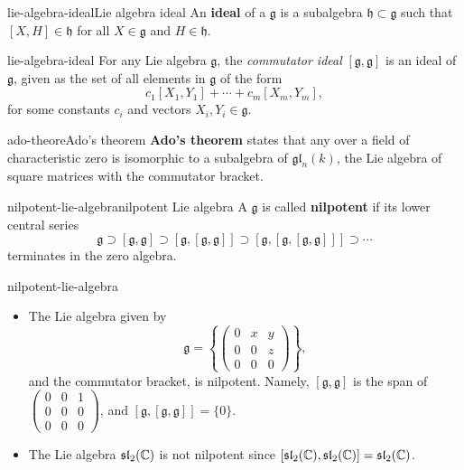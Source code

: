 \begin{topic}{lie-algebra-ideal}{Lie algebra ideal}
    An \textbf{ideal} of a  $\mathfrak{g}$ is a subalgebra $\mathfrak{h} \subset \mathfrak{g}$ such that $[X, H] \in \mathfrak{h}$ for all $X \in \mathfrak{g}$ and $H \in \mathfrak{h}$.
\end{topic}

\begin{example}{lie-algebra-ideal}
    For any Lie algebra $\mathfrak{g}$, the \textit{commutator ideal} $[\mathfrak{g}, \mathfrak{g}]$ is an ideal of $\mathfrak{g}$, given as the set of all elements in $\mathfrak{g}$ of the form
    \[ c_1 [X_1, Y_1] + \cdots + c_m [X_m, Y_m] , \]
    for some constants $c_i$ and vectors $X_i, Y_i \in \mathfrak{g}$.
\end{example}

\begin{topic}{ado-theore}{Ado's theorem}
    \textbf{Ado's theorem} states that any  over a field of characteristic zero is isomorphic to a subalgebra of $\mathfrak{gl}_n(k)$, the Lie algebra of square matrices with the commutator bracket.
\end{topic}

\begin{topic}{nilpotent-lie-algebra}{nilpotent Lie algebra}
    A  $\mathfrak{g}$ is called \textbf{nilpotent} if its lower central series
    \[ \mathfrak{g} \supset [\mathfrak{g}, \mathfrak{g}] \supset [\mathfrak{g}, [\mathfrak{g}, \mathfrak{g}]] \supset [\mathfrak{g}, [\mathfrak{g}, [\mathfrak{g}, \mathfrak{g}]]] \supset \cdots \]
    terminates in the zero algebra.
\end{topic}

\begin{example}{nilpotent-lie-algebra}
    \begin{itemize}
        \item The Lie algebra given by
        \[ \mathfrak{g} = \left\{ \begin{pmatrix} 0 & x & y \\ 0 & 0 & z \\ 0 & 0 & 0 \end{pmatrix} \right\} , \]
        and the commutator bracket, is nilpotent. Namely, $[\mathfrak{g}, \mathfrak{g}]$ is the span of $\begin{pmatrix} 0 & 0 & 1 \\ 0 & 0 & 0 \\ 0 & 0 & 0 \end{pmatrix}$, and $[\mathfrak{g}, [\mathfrak{g}, \mathfrak{g}]] = \{ 0 \}$.
        
        \item The Lie algebra $\mathfrak{sl}_2(\mathbb{C})$ is not nilpotent since $[\mathfrak{sl}_2(\mathbb{C}), \mathfrak{sl}_2(\mathbb{C})] = \mathfrak{sl}_2(\mathbb{C})$.
    \end{itemize}
\end{example}

